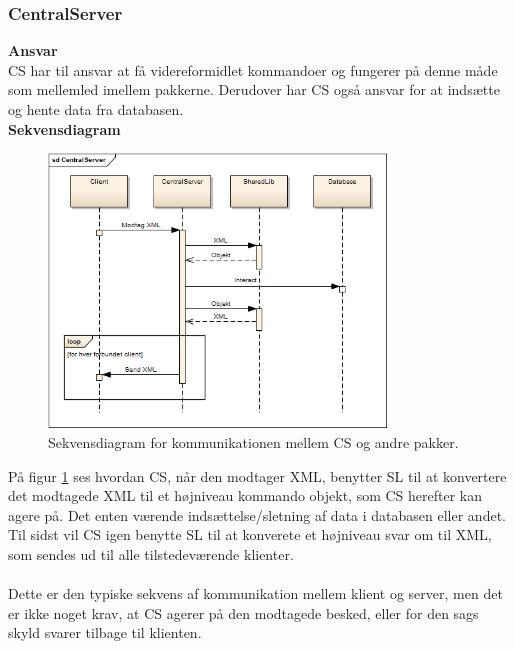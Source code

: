 \subsubsection{CentralServer}

\textbf{Ansvar}\\
\gls{CS} har til ansvar at få videreformidlet kommandoer og fungerer på denne måde som mellemled imellem pakkerne. Derudover har \gls{CS} også ansvar for at indsætte og hente data fra databasen.\\

\textbf{Sekvensdiagram}

\begin{figure}[H]
    \centering
    \includegraphics[width=0.8\textwidth]{Systemarkitektur/LogiskView/CentralServer.PNG}
    \caption{Sekvensdiagram for kommunikationen mellem \gls{CS} og andre pakker.}
    \label{fig:cssekv}
\end{figure}

På figur \ref{fig:cssekv} ses hvordan \gls{CS}, når den modtager XML, benytter \gls{SL} til at konvertere det modtagede XML til et højniveau kommando objekt, som \gls{CS} herefter kan agere på. Det enten værende indsættelse/sletning af data i databasen eller andet. Til sidst vil \gls{CS} igen benytte \gls{SL} til at konverete et højniveau svar om til XML, som sendes ud til alle tilstedeværende klienter.\\\\

Dette er den typiske sekvens af kommunikation mellem klient og server, men det er ikke noget krav, at \gls{CS} agerer på den modtagede besked, eller for den sags skyld svarer tilbage til klienten.